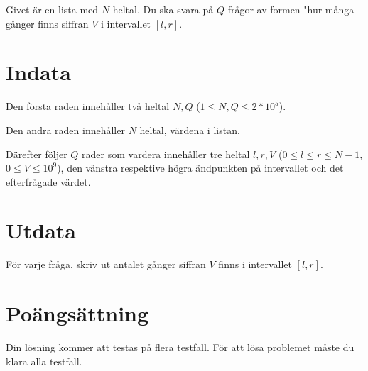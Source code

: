 Givet är en lista med $N$ heltal. Du ska svara på $Q$ frågor av formen "hur många gånger finns
siffran $V$ i intervallet $[l,r]$.

\section*{Indata}
Den första raden innehåller två heltal $N,Q$ ($1 \leq N,Q \leq 2*10^5$).

Den andra raden innehåller $N$ heltal, värdena i listan.

Därefter följer $Q$ rader som vardera innehåller tre heltal $l, r, V$ ($0 \leq l \leq r \leq N-1$, $0 \leq V \leq 10^9$),
den vänstra respektive högra ändpunkten på intervallet och det efterfrågade värdet.

\section*{Utdata}
För varje fråga, skriv ut antalet gånger siffran $V$ finns i intervallet $[l,r]$.

\section*{Poängsättning}
Din lösning kommer att testas på flera testfall.
\noindent
För att lösa problemet måste du klara alla testfall.
